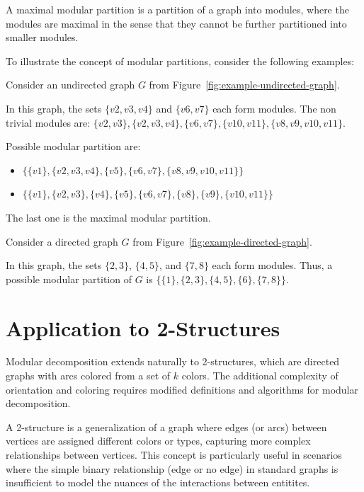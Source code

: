 \begin{mydef}
    A maximal modular partition is a partition of a graph into modules, where the modules are maximal in the sense that they cannot be further partitioned into smaller modules.
\end{mydef}

To illustrate the concept of modular partitions, consider the following examples:

\begin{myex}
    Consider an undirected graph $G$ from Figure~\ref{fig:example-undirected-graph}.

    In this graph, the sets $\{v2, v3, v4\}$ and $\{v6, v7\}$ each form modules.
    The non trivial modules are: $\{v2, v3\}, \{v2, v3, v4\}, \{v6, v7\}, \{v10, v11\}, \{v8, v9, v10, v11\}$.

    Possible modular partition are:
    \begin{itemize}
        \item $\{\{v1\}, \{v2, v3, v4\}, \{v5\}, \{v6, v7\}, \{v8, v9, v10, v11\}\}$
        \item $\{\{v1\}, \{v2, v3\}, \{v4\}, \{v5\}, \{v6, v7\}, \{v8\}, \{v9\}, \{v10, v11\}\}$
    \end{itemize}
    The last one is the maximal modular partition.
\end{myex}

\begin{myex}
    Consider a directed graph $G$ from Figure~\ref{fig:example-directed-graph}.

    In this graph, the sets $\{2, 3\}$, $\{4, 5\}$, and $\{7, 8\}$ each form modules.
    Thus, a possible modular partition of $G$ is $\{\{1\}, \{2, 3\}, \{4, 5\}, \{6\}, \{7, 8\}\}$.
\end{myex}




\section{Application to 2-Structures}\label{sec:application-to-2-structures}

Modular decomposition extends naturally to 2-structures, which are directed graphs with arcs colored from a set of $k$ colors.
The additional complexity of orientation and coloring requires modified definitions and algorithms for modular decomposition.

A 2-structure is a generalization of a graph where edges (or arcs) between vertices are assigned different colors or types, capturing more complex relationships between vertices.
This concept is particularly useful in scenarios where the simple binary relationship (edge or no edge) in standard graphs is insufficient to model the nuances of the interactions between entitites.

